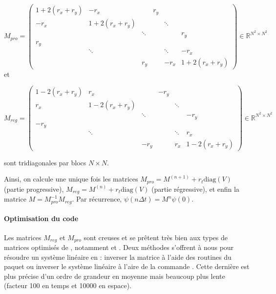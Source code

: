 \begin{equation}
    M_{pro} =  \begin{pmatrix}
1+2(r_x+r_y) & -r_x &  & r_y &  &  \\
-r_x & 1+2(r_x+r_y) &  &  & \ddots &  \\
 &  & \ddots &  &  & r_y \\
r_y &  &  &  &  &  \\
 & \ddots &  &  & \ddots & -r_x \\
 &  & r_y &  & -r_x & 1+2(r_x+r_y) 
\end{pmatrix}  \in\mathbb{R}^{N^2\times N^2} 
\end{equation}
et

\begin{equation}
    M_{reg} =   \begin{pmatrix}
1-2(r_x+r_y) & r_x &  & -r_y &  &  \\
r_x & 1-2(r_x+r_y) &  &  & \ddots &  \\
 &  & \ddots &  &  & -r_y \\
-r_y &  &  &  &  &  \\
 & \ddots &  &  & \ddots & r_x \\
 &  & -r_y &  & r_x & 1-2(r_x+r_y) 
\end{pmatrix}  \in\mathbb{R}^{N^2\times N^2}
\end{equation}


sont tridiagonales par blocs $N\times N$.




Ainsi, on calcule une unique fois les matrices $M_{pro} = M^{(n+1)}  + r_t \text{diag}(V)$ (partie progressive), $M_{reg} = M^{(n)}  + r_t \text{diag}(V)$ (partie régressive), et enfin la matrice $M = M_{pro}^{-1}M_{reg}$. Par récurrence, $\psi(n\Delta t) = M^n \psi (0)$.

\paragraph{Optimisation du code}
Les matrices $M_{reg}$ et $M_{pro}$ sont creuses et se prêtent très bien aux types de matrices optimisés de , notamment  et .
Deux méthodes s'offrent à nous pour résoudre un système linéaire en : inverser la matrice à l'aide des routines du paquet  ou inverser le système linéaire à l'aire de la commande \codeword{\ }. Cette dernière est plus précise d'un ordre de grandeur en moyenne mais beaucoup plus lente (facteur 100 en temps et 10000 en espace).

